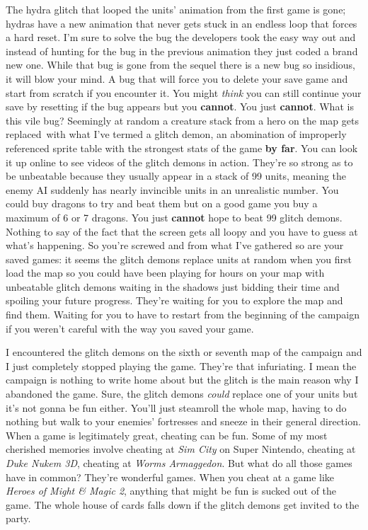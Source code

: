 \documentclass{book}
\begin{document}
The hydra glitch that looped the units’ animation from the first game is gone; hydras have a new animation that never gets stuck in an endless loop that forces a hard reset. I’m sure to solve the bug the developers took the easy way out and instead of hunting for the bug in the previous animation they just coded a brand new one. While that bug is gone from the sequel there is a new bug so insidious, it will blow your mind. A bug that will force you to delete your save game and start from scratch if you encounter it. You might \emph{think} you can still continue your save by resetting if the bug appears but you \textbf{cannot}. You just \textbf{cannot}. What is this vile bug? Seemingly at random a creature stack from a hero on the map gets replaced with what I’ve termed a glitch demon, an abomination of improperly referenced sprite table with the strongest stats of the game \textbf{by far}. You can look it up online to see videos of the glitch demons in action. They’re so strong as to be unbeatable because they usually appear in a stack of 99 units, meaning the enemy AI suddenly has nearly invincible units in an unrealistic number. You could buy dragons to try and beat them but on a good game you buy a maximum of 6 or 7 dragons. You just \textbf{cannot} hope to beat 99 glitch demons. Nothing to say of the fact that the screen gets all loopy and you have to guess at what’s happening. So you’re screwed and from what I’ve gathered so are your saved games: it seems the glitch demons replace units at random when you first load the map so you could have been playing for hours on your map with unbeatable glitch demons waiting in the shadows just bidding their time and spoiling your future progress. They’re waiting for you to explore the map and find them. Waiting for you to have to restart from the beginning of the campaign if you weren’t careful with the way you saved your game.

I encountered the glitch demons on the sixth or seventh map of the campaign and I just completely stopped playing the game. They’re that infuriating. I mean the campaign is nothing to write home about but the glitch is the main reason why I abandoned the game. Sure, the glitch demons \emph{could} replace one of your units but it’s not gonna be fun either. You’ll just steamroll the whole map, having to do nothing but walk to your enemies’ fortresses and sneeze in their general direction. When a game is legitimately great, cheating can be fun. Some of my most cherished memories involve cheating at \emph{Sim City} on Super Nintendo, cheating at \emph{Duke Nukem 3D}, cheating at \emph{Worms Armaggedon}. But what do all those games have in common? They’re wonderful games. When you cheat at a game like \emph{Heroes of Might \& Magic 2}, anything that might be fun is sucked out of the game. The whole house of cards falls down if the glitch demons get invited to the party.
\end{document}
